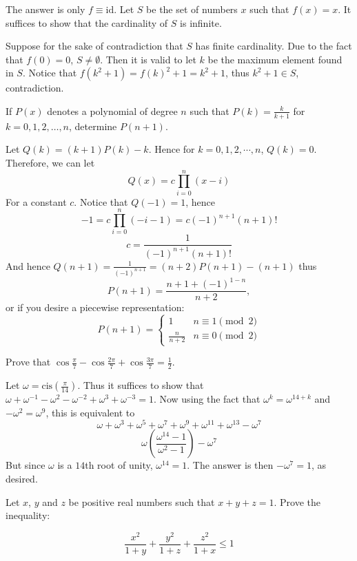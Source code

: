 \documentclass[11pt]{scrartcl}
\begin{document}
\begin{soln}
  The answer is only $f\equiv \mathrm{id}$. Let $S$ be the set of numbers $x$ such that $f(x)=x$. It suffices to show that the
  cardinality of $S$ is infinite.

  Suppose for the sake of contradiction that $S$ has finite cardinality. Due to
  the fact that $f(0)=0$, $S\ne \emptyset$. Then it is valid to let $k$ be the maximum
  element found in $S$. Notice that $f(k^2+1)=f(k)^2+1=k^2+1$, thus $k^2+1\in S$, contradiction.
\end{soln}
\begin{example}
  [USAMO 1975]
  If $ P(x)$ denotes a polynomial of degree $ n$ such that $ P(k)=\frac{k}{k+1}$ for $ k=0,1,2,\ldots,n$, determine $ P(n+1)$.
\end{example}
\begin{soln}
  Let $Q(k)=(k+1)P(k)-k$. Hence for $k=0,1,2,\cdots, n$, $Q(k)=0$. Therefore, we can let
  $$Q(x)=c\prod_{i=0}^{n}(x-i)$$
  For a constant $c$. Notice that $Q(-1)=1$, hence
  $$-1=c\prod_{i=0}^n (-i-1)=c(-1)^{n+1}(n+1)!$$
  $$c=\frac{1}{(-1)^{n+1}(n+1)!}$$
  And hence $Q(n+1)=\frac{1}{(-1)^{n+1}}=(n+2)P(n+1)-(n+1)$ thus
  $$\boxed{P(n+1)=\frac{n+1+(-1)^{1-n}}{n+2}},$$
  or if you desire a piecewise representation:
  $$\boxed{P(n+1)=\begin{cases}1 & n\equiv 1 \pmod{2} \\ \frac{n}{n+2} & n\equiv 0 \pmod{2}\end{cases}}$$
\end{soln}
\begin{example}
  [IMO 1963]
  Prove that $\cos{\frac{\pi}{7}}-\cos{\frac{2\pi}{7}}+\cos{\frac{3\pi}{7}}=\frac{1}{2}$.
\end{example}
\begin{soln}
  Let $\omega=\mathrm{cis}\left(\frac{\pi}{14}\right)$. Thus it suffices to show that $\omega+\omega^{-1}-\omega^2-\omega^{-2}+\omega^3+\omega^{-3}=1$. Now using the fact that $\omega^k=\omega^{14+k}$ and $-\omega^2=\omega^9$, this is equivalent to\[\omega+\omega^3+\omega^5+\omega^7+\omega^9+\omega^{11}+\omega^{13}-\omega^7\]\[\omega\left(\frac{\omega^{14}-1}{\omega^2-1}\right)-\omega^7\]But since $\omega$ is a $14$th root of unity, $\omega^{14}=1$. The answer is then $-\omega^{7}=1$, as desired.
\end{soln}
\begin{example}
  [JMMO]
  Let $x$, $y$ and $z$ be positive real numbers such that $x+y+z = 1$. Prove the inequality:

  $$\frac{x^2}{1+y}+\frac{y^2}{1+z} +\frac{z^2}{1+x} \leq 1$$
\end{example}
\end{document}
